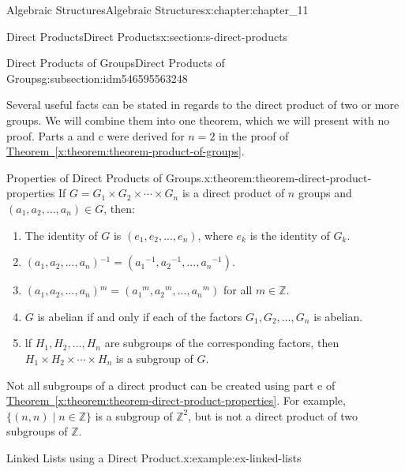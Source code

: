 \documentclass[oneside,10pt,]{book}
\newcommand{\xreffont}{\relax}
\numberwithin{equation}{section}
\begin{document}
\begin{chapterptx}{Algebraic Structures}{}{Algebraic Structures}{}{}{x:chapter:chapter_11}
\begin{sectionptx}{Direct Products}{}{Direct Products}{}{}{x:section:s-direct-products}
\begin{subsectionptx}{Direct Products of Groups}{}{Direct Products of Groups}{}{}{g:subsection:idm546595563248}
\par
Several useful facts can be stated in regards to the direct product of two or more groups. We will combine them into one theorem, which we will present with no proof. Parts a and c were derived for \(n = 2\) in the proof of \hyperref[x:theorem:theorem-product-of-groups]{Theorem~{\xreffont\ref{x:theorem:theorem-product-of-groups}}}.%
\begin{theorem}{Properties of Direct Products of Groups.}{}{x:theorem:theorem-direct-product-properties}%
If \(G = G_1\times  G_2 \times  \cdots  \times  G_n\) is a direct product of \(n\) groups and \(\left(a_1,
a_2 , \dots , a_n\right) \in  G\), then:%
\begin{enumerate}[label=(\alph*)]
\item{}The identity of \(G\) is \(\left(e_1, e_2 , . . . , e_n\right)\), where \(e_k\) is the identity of \(G_k\).%
\item{}\(\left(a_1, a_2 , . . . , a_n\right) {}^{-1}= \left(a_1{}^{-1}, a_2{}^{-1} , . . . , a_n{}^{-1}\right)\).%
\item{}\(\left(a_1, a_2 , . . . , a_n\right) {}^m= \left(a_1{}^m, a_2{}^m , . . . , a_n{}^m\right)\) for all \(m\in \mathbb{Z}\).%
\item{}\(G\) is abelian if and only if each of the factors \(G_1, G_2, \ldots , G_n\) is abelian.%
\item{}lf \(H_1, H_2, \ldots , H_n\) are subgroups of the corresponding factors, then \(H_1\times  H_2 \times  \cdots  \times  H_n\) is a subgroup of \(G\).%
\end{enumerate}
%
\end{theorem}
Not all subgroups of a direct product can be created using part e of \hyperref[x:theorem:theorem-direct-product-properties]{Theorem~{\xreffont\ref{x:theorem:theorem-direct-product-properties}}}. For example, \(\{(n, n) \mid n \in  \mathbb{Z}\}\) is a subgroup of \(\mathbb{Z}^2\), but is not a direct product of two subgroups of \(\mathbb{Z}\).%
\begin{example}{Linked Lists using a Direct Product.}{x:example:ex-linked-lists}%

\end{example}
\end{subsectionptx}
\end{sectionptx}
\end{chapterptx}
\end{document}
